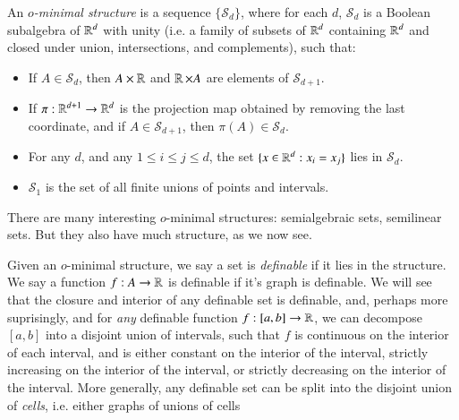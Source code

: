 An \emph{$o$-minimal structure} is a sequence $\{ \mathcal{S}_d \}$, where for each $d$, $\mathcal{S}_d$ is a Boolean subalgebra of $\operatorname{\mathbb{R}}^d$ with unity (i.e. a family of subsets of $\operatorname{\mathbb{R}}^d$ containing $\operatorname{\mathbb{R}}^d$ and closed under union, intersections, and complements), such that:
%
\begin{itemize}
    \item If $A \in \mathcal{S}_d$, then $A \times \operatorname{\mathbb{R}}$ and $\operatorname{\mathbb{R}} \times A$ are elements of $\mathcal{S}_{d+1}$.
    \item If $\pi: \operatorname{\mathbb{R}}^{d+1} \to \operatorname{\mathbb{R}}^d$ is the projection map obtained by removing the last coordinate, and if $A \in \mathcal{S}_{d+1}$, then $\pi(A) \in \mathcal{S}_d$.
    \item For any $d$, and any $1 \leq i \leq j \leq d$, the set $\{ x \in \operatorname{\mathbb{R}}^d : x_i = x_j \}$ lies in $\mathcal{S}_d$.
    \item $\mathcal{S}_1$ is the set of all finite unions of points and intervals.
\end{itemize}
%
There are many interesting $o$-minimal structures: semialgebraic sets, semilinear sets. But they also have much structure, as we now see.

Given an $o$-minimal structure, we say a set is \emph{definable} if it lies in the structure. We say a function $f: A \to \operatorname{\mathbb{R}}$ is definable if it's graph is definable. We will see that the closure and interior of any definable set is definable, and, perhaps more suprisingly, and for \emph{any} definable function $f: [a,b] \to \operatorname{\mathbb{R}}$, we can decompose $[a,b]$ into a disjoint union of intervals, such that $f$ is continuous on the interior of each interval, and is either constant on the interior of the interval, strictly increasing on the interior of the interval, or strictly decreasing on the interior of the interval. More generally, any definable set can be split into the disjoint union of \emph{cells}, i.e. either graphs of unions of cells
















